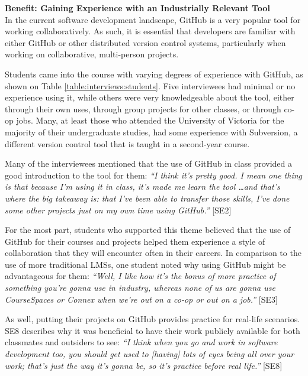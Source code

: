 \textbf{Benefit: Gaining Experience with an Industrially Relevant Tool} \\
In the current software development landscape, GitHub is a very popular tool for working collaboratively. As such, it is essential that developers are familiar with either GitHub or other distributed version control systems, particularly when working on collaborative, multi-person projects.

Students came into the course with varying degrees of experience with GitHub, as shown on Table \ref{table:interviews:students}. Five interviewees had minimal or no experience using it, while others were very knowledgeable about the tool, either through their own uses, through group projects for other classes, or through co-op jobs. Many, at least those who attended the University of Victoria for the majority of their undergraduate studies, had some experience with Subversion, a different version control tool that is taught in a second-year course.

Many of the interviewees mentioned that the use of GitHub in class provided a good introduction to the tool for them: \textit{``I think it's pretty good. I mean one thing is that because I'm using it in class, it's made me learn the tool \ldots and that's where the big takeaway is: that I've been able to transfer those skills, I've done some other projects just on my own time using GitHub.''} [SE2]


For the most part, students who supported this theme believed that the use of GitHub for their courses and projects helped them experience a style of collaboration that they will encounter often in their careers. In comparison to the use of more traditional LMSs, one student noted why using GitHub might be advantageous for them: \textit{``Well, I like how it's the bonus of more practice of something you're gonna use in industry, whereas none of us are gonna use CourseSpaces or Connex when we're out on a co-op or out on a job.''} [SE3]

As well, putting their projects on GitHub provides practice for real-life scenarios. SE8 describes why it was beneficial to have their work publicly available for both classmates and outsiders to see: \textit{``I think when you go and work in software development too, you should get used to [having] lots of eyes being all over your work; that's just the way it's gonna be, so it's practice before real life.''} [SE8]


